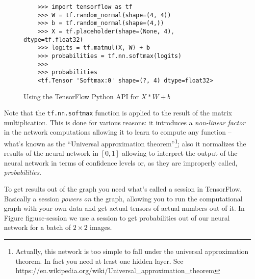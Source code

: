 \begin{figure}
  \begin{verbatim}
    >>> import tensorflow as tf
    >>> W = tf.random_normal(shape=(4, 4))
    >>> b = tf.random_normal(shape=(4,))
    >>> X = tf.placeholder(shape=(None, 4), dtype=tf.float32)
    >>> logits = tf.matmul(X, W) + b
    >>> probabilities = tf.nn.softmax(logits)
    >>>
    >>> probabilities
    <tf.Tensor 'Softmax:0' shape=(?, 4) dtype=float32>
  \end{verbatim}
  \caption{Using the TensorFlow Python API for $X * W + b$}
\end{figure}

Note that the \texttt{tf.nn.softmax} function is applied to the result of
the matrix multiplication. This is done for various reasons: it
introduces a \emph{non-linear factor} in the network computations
allowing it to learn to compute any function -- what's known as the
``Universal approximation theorem''\footnote{Actually, this network is
too simple to fall under the universal approximation theorem. In fact
you need at least one hidden layer. See
https://en.wikipedia.org/wiki/Universal\_approximation\_theorem}; also
it normalizes the results of the neural network in $[0,1]$ allowing to
interpret the output of the neural network in terms of confidence
levels or, as they are improperly called, \emph{probabilities}.

To get results out of the graph you need what's called a session in
TensorFlow. Basically a session \emph{powers on} the graph, allowing
you to run the computational graph with your own data and get actual
tensors of actual numbers out of it. In Figure {fig:use-session} we use a
session to get probabilities out of our neural network for a batch of
\( 2 \times 2 \) images.

